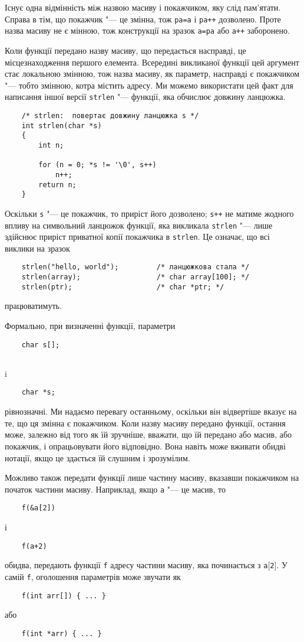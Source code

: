 \documentclass[a4paper,12pt]{book}
\begin{document}
  Існує одна відмінність між назвою масиву і покажчиком, яку слід пам'ятати. Справа в тім,
  що покажчик "--- це змінна, тож \texttt{pa=a} і \texttt{pa++} дозволено. Проте назва
  масиву не є мінною, тож конструкції на зразок \texttt{a=pa} або \texttt{a++} заборонено.

  Коли функції передано назву масиву, що передається насправді, це місцезнаходження
  першого елемента. Всередині викликаної функції цей аргумент стає локальною змінною, тож
  назва масиву, як параметр, насправді є покажчиком "--- тобто змінною, котра містить
  адресу. Ми можемо використати цей факт для написання іншої версії
  \texttt{strlen} "--- функції, яка обчислює довжину ланцюжка.

  \begin{verbatim}
    /* strlen:  повертає довжину ланцюжка s */
    int strlen(char *s)
    {
        int n;

        for (n = 0; *s != '\0', s++)
            n++;
        return n;
    }
  \end{verbatim}

  Оскільки \texttt{s} "--- це покажчик, то приріст його дозволено; \texttt{s++} не
  матиме жодного впливу на символьний ланцюжок функції, яка викликала \texttt{strlen}
  "--- лише здійснює приріст приватної копії покажчика в \texttt{strlen}. Це означає,
  що всі виклики на зразок
  \begin{verbatim}
    strlen("hello, world");         /* ланцюжкова стала */
    strlen(array);                  /* char array[100]; */
    strlen(ptr);                    /* char *ptr; */
  \end{verbatim}
  працюватимуть.

  Формально, при визначенні функції, параметри
  \begin{verbatim}
    char s[];
  \end{verbatim}
  i
  \begin{verbatim}
    char *s;
  \end{verbatim}
  рівнозначні. Ми надаємо перевагу останньому, оскільки він відвертіше вказує на те, що ця
  змінна є покажчиком. Коли назву масиву передано функції, остання може, залежно від того
  як їй зручніше, вважати, що їй передано або масив, або покажчик, і опрацьовувати його
  відповідно. Вона навіть може вживати обидві нотації, якщо це здається їй слушним і
  зрозумілим.

  Можливо також передати функції лише частину масиву, вказавши покажчиком на початок
  частини масиву. Наприклад, якщо \texttt{a} "--- це масив, то
  \begin{verbatim}
    f(&a[2])
  \end{verbatim}
  і
  \begin{verbatim}
    f(a+2)
  \end{verbatim}
  обидва, передають функції \texttt{f} адресу частини масиву, яка починається з
  \texttt{a\mbox{$[$}2\mbox{$]$}}. У самій \texttt{f}, оголошення параметрів може звучати як
  \begin{verbatim}
    f(int arr[]) { ... }
  \end{verbatim}
  або
  \begin{verbatim}
    f(int *arr) { ... }
  \end{verbatim}
\end{document}
